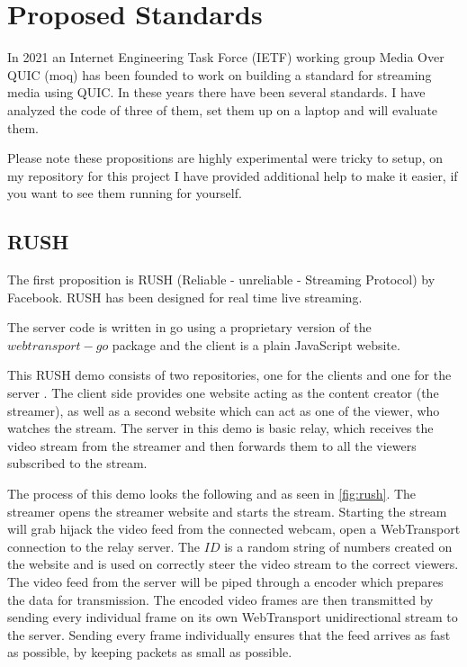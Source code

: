 \documentclass[conference]{IEEEtran}
\begin{document}
\section{Proposed Standards}
In 2021 an Internet Engineering Task Force (IETF) working group Media Over QUIC (moq) has been founded to work on building a standard for streaming media using QUIC. In these years there have been several standards. I have analyzed the code of three of them, set them up on a laptop and will evaluate them.

Please note these propositions are highly experimental were tricky to setup, on my repository for this project \cite{b13} I have provided additional help to make it easier, if you want to see them running for yourself.

\subsection{RUSH}
The first proposition is RUSH (Reliable - unreliable - Streaming Protocol) \cite{b14} by Facebook. RUSH has been designed for real time live streaming.

The server code is written in go using a proprietary version of the $webtransport-go$ package \cite{b15} and the client is a plain JavaScript website. 

This RUSH demo consists of two repositories, one for the clients \cite{b16} and one for the server \cite{b17}. The client side provides one website acting as the content creator (the streamer), as well as a second website which can act as one of the viewer, who watches the stream. The server in this demo is basic relay, which receives the video stream from the streamer and then forwards them to all the viewers subscribed to the stream.

The process of this demo looks the following and as seen in \cref{fig:rush}. The streamer opens the streamer website and starts the stream. Starting the stream will grab hijack the video feed from the connected webcam, open a WebTransport connection to the relay server. The $ID$ is a random string of numbers created on the website and is used on correctly steer the video stream to the correct viewers. The video feed from the server will be piped through a encoder which prepares the data for transmission. The encoded video frames are then transmitted by sending every individual frame on its own WebTransport unidirectional stream to the server. Sending every frame individually ensures that the feed arrives as fast as possible, by keeping packets as small as possible. 
\end{document}
